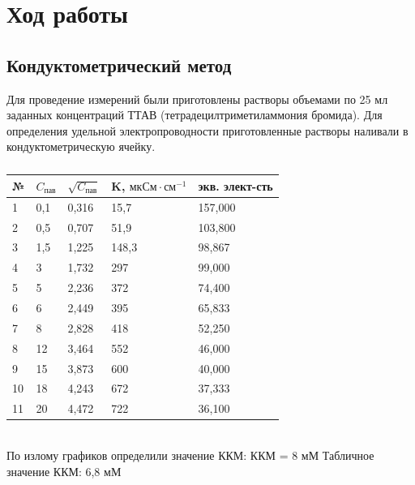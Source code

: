 \documentclass[a4paper,12pt]{article} %
\begin{document}
\newpage

\section{Ход работы}
\subsection{Кондуктометрический метод}
Для проведение измерений были приготовлены растворы объемами по 25 мл заданных концентраций ТТАВ (тетрадецилтриметиламмония бромида). Для определения удельной электропроводности приготовленные растворы наливали в кондуктометрическую ячейку.\\
\begin{table}[h!]
\centering
\caption{}
\label{my-label}
\begin{tabular}{|l|l|l|l|l|}
\hline
№  & $C_{\text{пав}}$ & $\sqrt{C_{\text{пав}}}$ & K, $\text{мкСм}\cdot\text{см}^{-1}$ & экв. элект-сть \\
\hline
1  & 0,1    & 0,316        & 15,7                          & 157,000       \\
\hline
2  & 0,5    & 0,707        & 51,9                          & 103,800       \\
\hline
3  & 1,5    & 1,225        & 148,3                         & 98,867        \\
\hline
4  & 3      & 1,732        & 297                           & 99,000        \\
\hline
5  & 5      & 2,236        & 372                           & 74,400        \\
\hline
6  & 6      & 2,449        & 395                           & 65,833        \\
\hline
7  & 8      & 2,828        & 418                           & 52,250        \\
\hline
8  & 12     & 3,464        & 552                           & 46,000        \\
\hline
9  & 15     & 3,873        & 600                           & 40,000        \\
\hline
10 & 18     & 4,243        & 672                           & 37,333        \\
\hline
11 & 20     & 4,472        & 722                           & 36,100        \\
\hline

\end{tabular}
\end{table}\\
По излому графиков определили значение ККМ: 
ККМ = 8 мМ 
Табличное значение ККМ: 6,8 мМ
\end{document}
